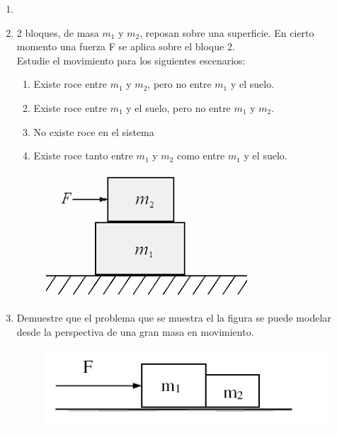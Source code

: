 \documentclass[letterpaper,11pt]{article}
\begin{document}
\vspace{-1cm}
\begin{enumerate}\setlength{\itemsep}{0.4cm}


\item[]

\item 2 bloques, de masa $m_1$ y $m_2$, reposan sobre una superficie. En cierto momento una fuerza F se aplica sobre el bloque 2. \\
Estudie el movimiento para los siguientes escenarios:\\
\begin{enumerate}


\item Existe roce entre $m_1$ y $m_2$, pero no entre $m_1$ y el suelo.
\item Existe roce entre $m_1$ y el suelo, pero no entre $m_1$ y $m_2$.
\item No existe roce en el sistema
\item Existe roce tanto entre $m_1$ y $m_2$ como entre $m_1$ y el suelo.
\end{enumerate}

\begin{figure}[h!]
    \centering
    \includegraphics[scale=0.3]{2021-1/Imagenes/ejercicios/images.png}
    \label{fig:my_label}
\end{figure}

\item Demuestre que el problema que se muestra el la figura se puede modelar desde la perspectiva  de una gran masa en movimiento. 
\begin{figure}[h!]
    \centering
    \includegraphics[scale=0.3]{2021-1/Imagenes/ejercicios/images-2.png}
    \label{fig:my_label}
\end{figure}


\end{enumerate}
\end{document}
